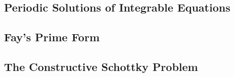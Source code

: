 \documentclass{amsart}
\begin{document}
\subsection{Periodic Solutions of Integrable Equations}

\subsection{Fay's Prime Form}

\subsection{The Constructive Schottky Problem}


\end{document}
